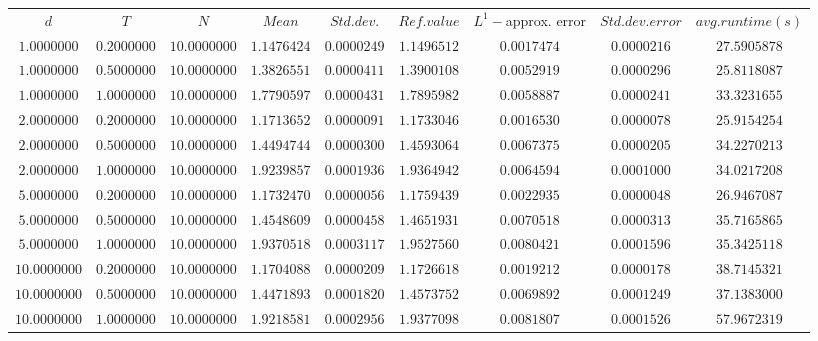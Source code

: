 \begin{tabular}{ccccccccc}
$d$ & $T$ & $N$ & $Mean$ & $Std. dev.$ & $Ref. value$ & $L^1-$approx. error & $Std. dev. error$ & $avg. runtime (s)$\\
$1.0000000$ & $0.2000000$ & $10.0000000$ & $1.1476424$ & $0.0000249$ & $1.1496512$ & $0.0017474$ & $0.0000216$ & $27.5905878$\\
$1.0000000$ & $0.5000000$ & $10.0000000$ & $1.3826551$ & $0.0000411$ & $1.3900108$ & $0.0052919$ & $0.0000296$ & $25.8118087$\\
$1.0000000$ & $1.0000000$ & $10.0000000$ & $1.7790597$ & $0.0000431$ & $1.7895982$ & $0.0058887$ & $0.0000241$ & $33.3231655$\\
$2.0000000$ & $0.2000000$ & $10.0000000$ & $1.1713652$ & $0.0000091$ & $1.1733046$ & $0.0016530$ & $0.0000078$ & $25.9154254$\\
$2.0000000$ & $0.5000000$ & $10.0000000$ & $1.4494744$ & $0.0000300$ & $1.4593064$ & $0.0067375$ & $0.0000205$ & $34.2270213$\\
$2.0000000$ & $1.0000000$ & $10.0000000$ & $1.9239857$ & $0.0001936$ & $1.9364942$ & $0.0064594$ & $0.0001000$ & $34.0217208$\\
$5.0000000$ & $0.2000000$ & $10.0000000$ & $1.1732470$ & $0.0000056$ & $1.1759439$ & $0.0022935$ & $0.0000048$ & $26.9467087$\\
$5.0000000$ & $0.5000000$ & $10.0000000$ & $1.4548609$ & $0.0000458$ & $1.4651931$ & $0.0070518$ & $0.0000313$ & $35.7165865$\\
$5.0000000$ & $1.0000000$ & $10.0000000$ & $1.9370518$ & $0.0003117$ & $1.9527560$ & $0.0080421$ & $0.0001596$ & $35.3425118$\\
$10.0000000$ & $0.2000000$ & $10.0000000$ & $1.1704088$ & $0.0000209$ & $1.1726618$ & $0.0019212$ & $0.0000178$ & $38.7145321$\\
$10.0000000$ & $0.5000000$ & $10.0000000$ & $1.4471893$ & $0.0001820$ & $1.4573752$ & $0.0069892$ & $0.0001249$ & $37.1383000$\\
$10.0000000$ & $1.0000000$ & $10.0000000$ & $1.9218581$ & $0.0002956$ & $1.9377098$ & $0.0081807$ & $0.0001526$ & $57.9672319$\\
\end{tabular}
